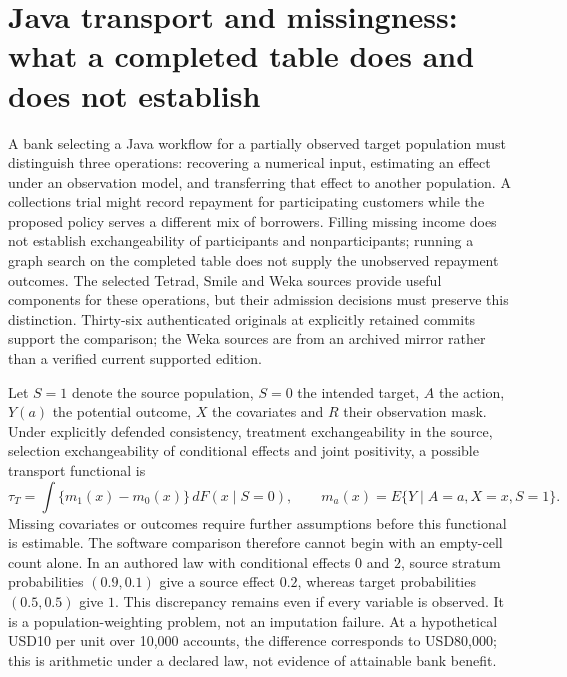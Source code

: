 \section[Java transport and missingness contracts]{Java transport and missingness: what a completed table does and does not establish}
\label{sec:exec25-jtm}

A bank selecting a Java workflow for a partially observed target population must distinguish three operations: recovering a numerical input, estimating an effect under an observation model, and transferring that effect to another population. A collections trial might record repayment for participating customers while the proposed policy serves a different mix of borrowers. Filling missing income does not establish exchangeability of participants and nonparticipants; running a graph search on the completed table does not supply the unobserved repayment outcomes. The selected Tetrad, Smile and Weka sources provide useful components for these operations, but their admission decisions must preserve this distinction. Thirty-six authenticated originals at explicitly retained commits support the comparison; the Weka sources are from an archived mirror rather than a verified current supported edition.\citep{exec25_jtm_tetrad,exec25_jtm_smile,exec25_jtm_weka}

Let $S=1$ denote the source population, $S=0$ the intended target, $A$ the action, $Y(a)$ the potential outcome, $X$ the covariates and $R$ their observation mask. Under explicitly defended consistency, treatment exchangeability in the source, selection exchangeability of conditional effects and joint positivity, a possible transport functional is
\[
 \tau_T=\int\{m_1(x)-m_0(x)\}\,dF(x\mid S=0),
 \qquad m_a(x)=E\{Y\mid A=a,X=x,S=1\}.
\]
Missing covariates or outcomes require further assumptions before this functional is estimable. The software comparison therefore cannot begin with an empty-cell count alone. In an authored law with conditional effects $0$ and $2$, source stratum probabilities $(0.9,0.1)$ give a source effect $0.2$, whereas target probabilities $(0.5,0.5)$ give $1$. This discrepancy remains even if every variable is observed. It is a population-weighting problem, not an imputation failure. At a hypothetical USD10 per unit over 10,000 accounts, the difference corresponds to USD80,000; this is arithmetic under a declared law, not evidence of attainable bank benefit.\citep{exec25_jtm_choice}

